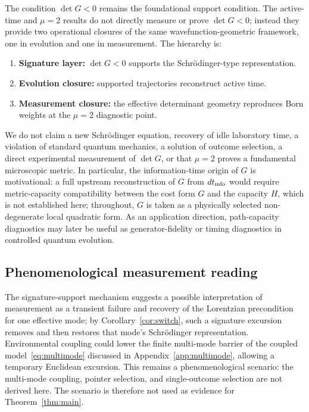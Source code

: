 \documentclass[11pt,a4paper]{article}
\theoremstyle{definition}
\begin{document}
The condition $\det G<0$ remains the foundational support condition. The
active-time and $\mu=2$ results do not directly measure or prove
$\det G<0$; instead they provide two operational closures of the same
wavefunction-geometric framework, one in evolution and one in
measurement. The hierarchy is:
\begin{enumerate}
\item \textbf{Signature layer:} $\det G<0$ supports the
Schr\"odinger-type representation.
\item \textbf{Evolution closure:} supported trajectories reconstruct
active time.
\item \textbf{Measurement closure:} the effective determinant geometry
reproduces Born weights at the $\mu=2$ diagnostic point.
\end{enumerate}
We do not claim a new Schr\"odinger equation, recovery of idle laboratory
time, a violation of standard quantum mechanics, a solution of outcome
selection, a direct experimental measurement of $\det G$, or that
$\mu=2$ proves a fundamental microscopic metric. In particular, the
information-time origin of $G$ is motivational: a full upstream
reconstruction of $G$ from $dt_{\rm info}$ would require metric-capacity
compatibility between the cost form $G$ and the capacity $H$, which is
not established here; throughout, $G$ is taken as a physically selected
non-degenerate local quadratic form. As an application
direction, path-capacity diagnostics may later be useful as
generator-fidelity or timing diagnostics in controlled quantum evolution.

\subsection{Phenomenological measurement reading}\label{sec:measurement}

The signature-support mechanism suggests a possible interpretation of measurement as a transient failure and recovery of the Lorentzian precondition for one effective mode; by Corollary~\ref{cor:switch}, such a signature excursion removes and then restores that mode's Schr\"odinger representation. Environmental coupling could lower the finite multi-mode barrier of the coupled model~\eqref{eq:multimode} discussed in Appendix~\ref{app:multimode}, allowing a temporary Euclidean excursion. This remains a phenomenological scenario: the multi-mode coupling, pointer selection, and single-outcome selection are not derived here. The scenario is therefore not used as evidence for Theorem~\ref{thm:main}.
\end{document}

